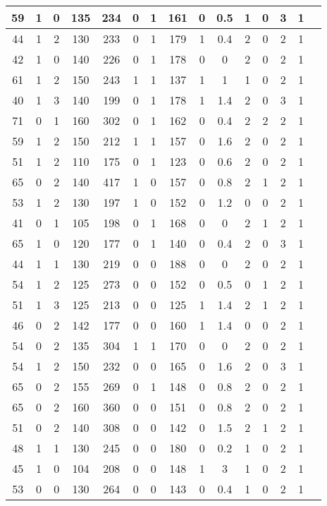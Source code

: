 \documentclass{article}
\begin{document}
\begin{longtable}{
|
c|c|c|c|c|c|c|c|c|c|c|c|c|c|c|}
\hline
59 & 1 & 0 & 135 & 234 & 0 & 1 & 161 & 0 & 0.5 & 1 & 0 & 3 & 1 \\
\hline
44 & 1 & 2 & 130 & 233 & 0 & 1 & 179 & 1 & 0.4 & 2 & 0 & 2 & 1 \\
\hline
42 & 1 & 0 & 140 & 226 & 0 & 1 & 178 & 0 & 0 & 2 & 0 & 2 & 1 \\
\hline
61 & 1 & 2 & 150 & 243 & 1 & 1 & 137 & 1 & 1 & 1 & 0 & 2 & 1 \\
\hline
40 & 1 & 3 & 140 & 199 & 0 & 1 & 178 & 1 & 1.4 & 2 & 0 & 3 & 1 \\
\hline
71 & 0 & 1 & 160 & 302 & 0 & 1 & 162 & 0 & 0.4 & 2 & 2 & 2 & 1 \\
\hline
59 & 1 & 2 & 150 & 212 & 1 & 1 & 157 & 0 & 1.6 & 2 & 0 & 2 & 1 \\
\hline
51 & 1 & 2 & 110 & 175 & 0 & 1 & 123 & 0 & 0.6 & 2 & 0 & 2 & 1 \\
\hline
65 & 0 & 2 & 140 & 417 & 1 & 0 & 157 & 0 & 0.8 & 2 & 1 & 2 & 1 \\
\hline
53 & 1 & 2 & 130 & 197 & 1 & 0 & 152 & 0 & 1.2 & 0 & 0 & 2 & 1 \\
\hline
41 & 0 & 1 & 105 & 198 & 0 & 1 & 168 & 0 & 0 & 2 & 1 & 2 & 1 \\
\hline
65 & 1 & 0 & 120 & 177 & 0 & 1 & 140 & 0 & 0.4 & 2 & 0 & 3 & 1 \\
\hline
44 & 1 & 1 & 130 & 219 & 0 & 0 & 188 & 0 & 0 & 2 & 0 & 2 & 1 \\
\hline
54 & 1 & 2 & 125 & 273 & 0 & 0 & 152 & 0 & 0.5 & 0 & 1 & 2 & 1 \\
\hline
51 & 1 & 3 & 125 & 213 & 0 & 0 & 125 & 1 & 1.4 & 2 & 1 & 2 & 1 \\
\hline
46 & 0 & 2 & 142 & 177 & 0 & 0 & 160 & 1 & 1.4 & 0 & 0 & 2 & 1 \\
\hline
54 & 0 & 2 & 135 & 304 & 1 & 1 & 170 & 0 & 0 & 2 & 0 & 2 & 1 \\
\hline
54 & 1 & 2 & 150 & 232 & 0 & 0 & 165 & 0 & 1.6 & 2 & 0 & 3 & 1 \\
\hline
65 & 0 & 2 & 155 & 269 & 0 & 1 & 148 & 0 & 0.8 & 2 & 0 & 2 & 1 \\
\hline
65 & 0 & 2 & 160 & 360 & 0 & 0 & 151 & 0 & 0.8 & 2 & 0 & 2 & 1 \\
\hline
51 & 0 & 2 & 140 & 308 & 0 & 0 & 142 & 0 & 1.5 & 2 & 1 & 2 & 1 \\
\hline
48 & 1 & 1 & 130 & 245 & 0 & 0 & 180 & 0 & 0.2 & 1 & 0 & 2 & 1 \\
\hline
45 & 1 & 0 & 104 & 208 & 0 & 0 & 148 & 1 & 3 & 1 & 0 & 2 & 1 \\
\hline
53 & 0 & 0 & 130 & 264 & 0 & 0 & 143 & 0 & 0.4 & 1 & 0 & 2 & 1 \\

\end{longtable}
\end{document}
